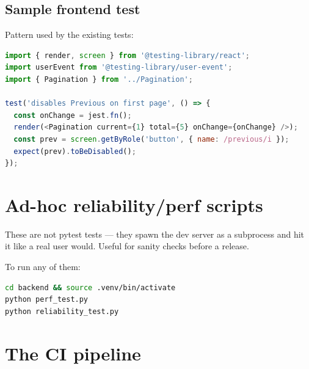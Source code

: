 \documentclass[11pt,a4paper,oneside]{book}
\DeclareRobustCommand{\fileref}[1]{\texorpdfstring{\colorbox{filerefbg}{\strut\ttfamily\small\detokenize{#1}}}{#1}}
\DeclareRobustCommand{\inlinecode}[1]{\texorpdfstring{\colorbox{codebg}{\strut\ttfamily\small\detokenize{#1}}}{#1}}
\begin{document}
\subsection{Sample frontend test}

Pattern used by the existing tests:

\begin{lstlisting}[language=JavaScript,caption={Component test sketch}]
import { render, screen } from '@testing-library/react';
import userEvent from '@testing-library/user-event';
import { Pagination } from '../Pagination';

test('disables Previous on first page', () => {
  const onChange = jest.fn();
  render(<Pagination current={1} total={5} onChange={onChange} />);
  const prev = screen.getByRole('button', { name: /previous/i });
  expect(prev).toBeDisabled();
});
\end{lstlisting}

\section{Ad-hoc reliability/perf scripts}

These are not pytest tests --- they spawn the dev server as a subprocess
and hit it like a real user would. Useful for sanity checks before a
release.


To run any of them:

\begin{lstlisting}[language=Bash,numbers=none]
cd backend && source .venv/bin/activate
python perf_test.py
python reliability_test.py
\end{lstlisting}

\section{The CI pipeline}
\end{document}
